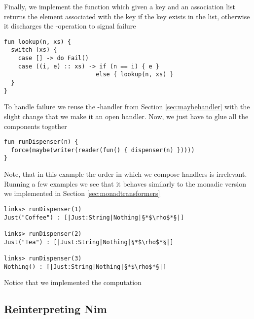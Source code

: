\begin{example}
Finally, we implement the  function which given a key and an association list returns the element associated with the key if the key exists in the list, otherwise it discharges the -operation to signal failure
\begin{lstlisting}[style=links]
fun lookup(n, xs) {
  switch (xs) {
    case [] -> do Fail()
    case ((i, e) :: xs) -> if (n == i) { e }
                          else { lookup(n, xs) }
  }
}
\end{lstlisting}
To handle failure we reuse the -handler from Section \ref{sec:maybehandler} with the slight change that we make it an open handler. Now, we just have to glue all the components together
\begin{lstlisting}[style=links]
fun runDispenser(n) {
  force(maybe(writer(reader(fun() { dispenser(n) }))))
}
\end{lstlisting}
Note, that in this example the order in which we compose handlers is irrelevant.
Running a few examples we see that it behaves similarly to the monadic version we implemented in Section \ref{sec:monadtransformers}
\begin{lstlisting}[style=links]
links> runDispenser(1)
Just("Coffee") : [|Just:String|Nothing|§*$\rho$*§|]

links> runDispenser(2)
Just("Tea") : [|Just:String|Nothing|§*$\rho$*§|]

links> runDispenser(3)
Nothing() : [|Just:String|Nothing|§*$\rho$*§|]
\end{lstlisting}
\end{example}
Notice that we implemented the computation 

\subsection{Reinterpreting Nim}